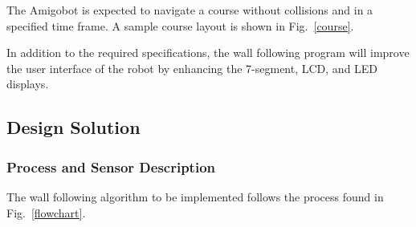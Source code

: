 The Amigobot is expected to navigate a course without collisions and
in a specified time frame. A sample course layout is shown in
Fig.~\ref{course}.

In addition to the required specifications, the wall following program
will improve the user interface of the robot by enhancing the
7-segment, LCD, and LED displays.

\subsection{Design Solution}

\subsubsection{Process and Sensor Description}

\begin{figure}[h!]
\centering
\cprotect {}
\end{figure}

The wall following algorithm to be implemented follows the
process found in Fig.~\ref{flowchart}.

